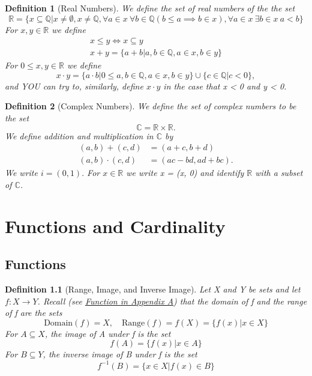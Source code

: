\documentclass[11pt, oneside]{book}
\theoremstyle{break}
\newtheorem{defn}{Definition}[section]
\newcommand{\bb}[1]{\mathbb{#1}}			%
\begin{document}
\begin{defn}[Real Numbers]
	We define the set of real numbers of the the set
	\[
		\bb{R} = \{x \subseteq \bb{Q} | x \neq \emptyset, x \neq \bb{Q}, \forall a \in x \> \forall b \in \bb{Q}(b \leq a \implies b \in x), \forall a \in x \> \exists b \in x \> a < b \}
	\]
	For $x, y \in \bb{R}$ we define
	\begin{gather*}
		x \leq y \iff x \subseteq y \\
		x + y = \{ a + b | a, b \in \bb{Q}, a \in x, b \in y\}
	\end{gather*}
	For $0 \leq x, y \in \bb{R}$ we define
	\[
		x \cdot y = \{ a \cdot b | 0 \leq a, b \in \bb{Q}, a \in x, b \in y\} \cup \{c \in \bb{Q} | c < 0\},
	\]
	and YOU can try to, similarly, define $x \cdot y$ in the case that x < 0 and y < 0.
\end{defn}

\begin{defn}[Complex Numbers]
	We define the set of complex numbers to be the set
	\[
		\bb{C} = \bb{R} \times \bb{R}.
	\]
	We define addition and multiplication in $\bb{C}$ by
	\begin{align*}
		(a, b) + (c, d) &= (a + c, b + d) \\
		(a, b) \cdot (c, d) &= (ac - bd, ad + bc).
	\end{align*}
	We write $i = (0, 1).$ For $x \in \bb{R}$ we write x = (x, 0) and identify $\bb{R}$ with a subset of $\bb{C}$.
\end{defn}



\chapter{Functions and Cardinality}


\section{Functions}
\begin{defn}[Range, Image, and Inverse Image]
	Let X and Y be sets and let $f: X \to Y$. Recall (see \hyperref[fn_apdxA]{Function in Appendix A}) that the domain of f and the range of f are the sets
	\[
		\text{Domain}(f) = X, \quad \text{Range}(f) = f(X) = \{f(x) | x \in X\}
	\]
	For $A \subseteq X$, the image of A under f is the set
	\[
		f(A) = \{f(x) | x \in A\}
	\]
	For $B \subseteq Y$, the inverse image of B under f is the set
	\[
		f^{-1}(B) = \{x \in X | f(x) \in B\}
	\]
\end{defn}
\end{document}
